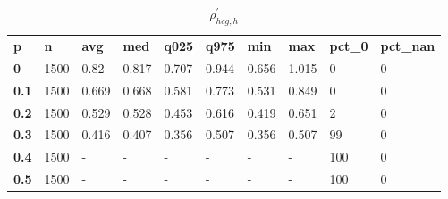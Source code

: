 \begin{table}[h]
 \centering 
\footnotesize
\caption{$\rho_{hcg,h}^\prime $}
\label{tab:alphahcgh}
\begin{tabular}[h]{| l l l l l l l l l l|
    } \hline
\textbf{ p} & \textbf{ n} & \textbf{ avg} & \textbf{ med} & \textbf{ q025} & \textbf{ q975} & \textbf{ min} & \textbf{ max} & \textbf{ pct\_0} & \textbf{ pct\_nan}
           \\
  \textbf{  0} & 1500 &  0.82 & 0.817 & 0.707 & 0.944 & 0.656 & 1.015 &   0 & 0
           \\
  \textbf{0.1} & 1500 & 0.669 & 0.668 & 0.581 & 0.773 & 0.531 & 0.849 &   0 & 0
           \\
  \textbf{0.2} & 1500 & 0.529 & 0.528 & 0.453 & 0.616 & 0.419 & 0.651 &   2 & 0
           \\
  \textbf{0.3} & 1500 & 0.416 & 0.407 & 0.356 & 0.507 & 0.356 & 0.507 &  99 & 0
           \\
  \textbf{0.4} & 1500 & - & - & - & - & - & - & 100 & 0
           \\
  \textbf{0.5} & 1500 & - & - & - & - & - & - & 100 & 0
           \\
 \hline \end{tabular}
 \end{table}
